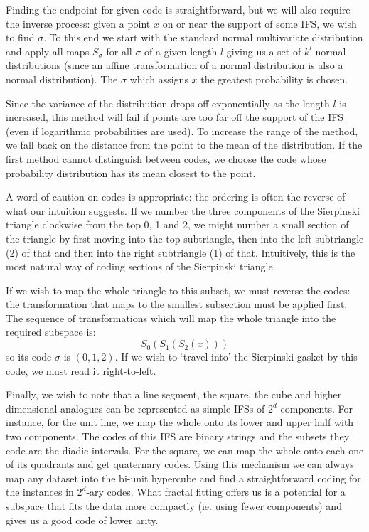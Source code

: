 \documentclass[10pt,a4paper,oneside]{article}
\theoremstyle{definition}
\begin{document}
Finding the endpoint for given code is straightforward, but we will also require the inverse process: given a point $x$ on or near the support of some IFS, we wish to find $\sigma$. To this end we start with the standard normal multivariate distribution and apply all maps $S_\sigma$ for all $\sigma$ of a given length $l$ giving us a set of $k^l$ normal distributions (since an affine transformation of a normal distribution is also a normal distribution). The $\sigma$ which assigns $x$ the greatest probability is chosen.

Since the variance of the distribution drops off exponentially as the length $l$ is increased, this method will fail if points are too far off the support of the IFS (even if logarithmic probabilities are used). To increase the range of the method, we fall back on the distance from the point to the mean of the distribution. If the first method cannot distinguish between codes, we choose the code whose probability distribution has its mean closest to the point.

A word of caution on codes is appropriate: the ordering is often the reverse of what our intuition suggests. If we number the three components of the Sierpinski triangle clockwise from the top 0, 1 and 2, we might number a small section of the triangle by first moving into the top subtriangle, then into the left subtriangle (2) of that and then into the right subtriangle (1) of that. Intuitively, this is the most natural way of coding sections of the Sierpinski triangle.

If we wish to map the whole triangle to this subset, we must reverse the codes: the transformation that maps to the smallest subsection must be applied first. The sequence of transformations which will map the whole triangle into the required subspace is:
\[
S_0(S_1(S_2(x)))
\]
so its code $\sigma$ is $(0, 1, 2)$. If we wish to `travel into' the Sierpinski gasket by this code, we must read it right-to-left.

Finally, we wish to note that a line segment, the square, the cube and higher dimensional analogues can be represented as simple IFSs of $2^d$ components. For instance, for the unit line, we map the whole onto its lower and upper half with two components. The codes of this IFS are binary strings and the subsets they code are the diadic intervals. For the square, we can map the whole onto each one of its quadrants and get quaternary codes. Using this mechanism we can always map any dataset into the bi-unit hypercube and find a straightforward coding for the instances in $2^d$-ary codes. What fractal fitting offers us is a potential for a subspace that fits the data more compactly (ie. using fewer components) and gives us a good code of lower arity.
\end{document}
